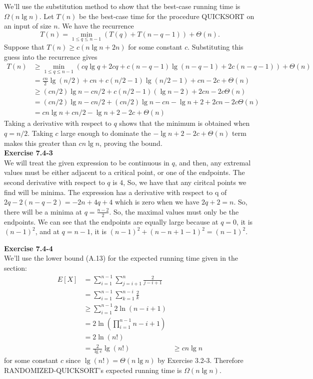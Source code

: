 \documentclass{article}
\begin{document}
We'll use the substitution method to show that the best-case running time is $\Omega(n \lg n)$.  Let $T(n)$ be the best-case time for the procedure QUICKSORT on an input of size $n$.  We have the recurrence
\[ T(n) = \min_{1 \leq q \leq n-1} (T(q) + T(n-q-1)) + \Theta(n).\]
Suppose that $T(n) \geq c(n\lg n + 2n)$ for some constant $c$.  Substituting this guess into the recurrence gives
\begin{align*}
T(n) &\geq \min_{1 \leq q \leq n-1} (cq\lg q + 2cq + c(n-q-1)\lg(n-q-1) + 2c(n-q-1)) + \Theta(n) \\
&= \frac{cn}{2}\lg(n/2) + cn + c(n/2 - 1)\lg(n/2 - 1) + cn - 2c+ \Theta(n) \\
&\geq (cn/2)\lg n - cn/2 + c(n/2 - 1)(\lg n - 2) + 2cn - 2c \Theta(n) \\
&= (cn/2)\lg n - cn/2 + (cn/2)\lg n - cn - \lg n + 2 + 2cn - 2c\Theta(n) \\
&=cn\lg n + cn/2 - \lg n + 2 - 2c + \Theta(n)
\end{align*}
Taking a derivative with respect to $q$ shows that the minimum is obtained when $q = n/2$.  Taking $c$ large enough to dominate the $-\lg n + 2 - 2c + \Theta(n)$ term makes this greater than $cn\lg n$, proving the bound. \\

\noindent\textbf{Exercise 7.4-3}\\
We will treat the given expression to be continuous in $q$, and then, any extremal values must be either adjacent to a critical point, or one of the endpoints. The second derivative with respect to $q$ is $4$, So, we have that any ciritcal points we find will be minima. The expression has a derivative with respect to q of $2q - 2 (n-q-2) = -2n + 4q +4$ which is zero when we have $2q+2 =n$. So, there will be a minima at $q= \frac{n-2}{2}$. So, the maximal values must only be the endpoints. We can see that the endpoints are equally large because at $q=0$, it is $(n-1)^2$, and at $q=n-1$, it is $(n-1)^2+ (n-n+1 -1)^2 = (n-1)^2$.


\noindent\textbf{Exercise 7.4-4}\\

We'll use the lower bound (A.13) for the expected running time given in the section:
\begin{align*}
E[X] &= \sum_{i=1}^{n-1}\sum_{j=i+1}^n \frac{2}{j-i+1} \\
&= \sum_{i=1}^{n-1} \sum_{k=1}^{n-i} \frac{2}{k} \\
&\geq \sum_{i=1}^{n-1} 2\ln(n-i+1) \\
&= 2\ln\left(\prod_{i=1}^{n-1} n-i+1\right) \\
&= 2\ln(n!) \\
&= \frac{2}{\lg e} \lg(n!)
&\geq cn \lg n
\end{align*}
for some constant $c$ since $\lg(n!) = \Theta(n \lg n)$ by Exercise 3.2-3. Therefore RANDOMIZED-QUICKSORT's expected running time is $\Omega(n \lg n)$. \\
\end{document}
